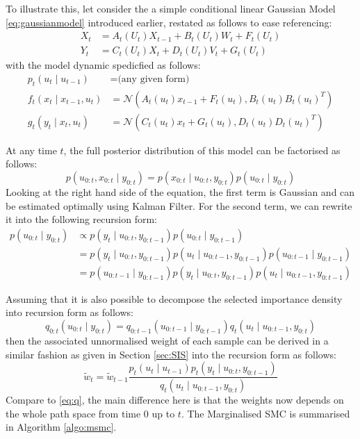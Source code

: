 To illustrate this, let consider the a simple conditional linear Gaussian Model \eqref{eq:gaussianmodel} introduced earlier, restated as follows to ease referencing:
\begin{align*}
  X_t &= A_t(U_t)X_{t-1} + B_t(U_t)W_t + F_t(U_t) \\
  Y_t &= C_t(U_t)X_t + D_t(U_t)V_t + G_t(U_t)
\end{align*}
with the model dynamic spedicfied as follows:
\begin{align}
  p_t(u_t \mid u_{t-1}) &= \textrm{(any given form)} \nonumber \\
  f_t(x_t \mid x_{t-1}, u_t) &= \mathcal{N}(A_t(u_t) x_{t-1} + F_t(u_t), B_t(u_t)B_t(u_t)^T) \nonumber \\
  g_t(y_t \mid x_t, u_t)    &= \mathcal{N}(C_t(u_t) x_t + G_t(u_t), D_t(u_t)D_t(u_t)^T)
\end{align}

At any time $t$, the full posterior distribution of this model can be factorised as follows:
\begin{equation}
  p(u_{0:t}, x_{0:t} \mid y_{0:t}) = p(x_{0:t} \mid u_{0:t}, y_{0:t}) p(u_{0:t} \mid y_{0:t})
\end{equation}
Looking at the right hand side of the equation, the first term is Gaussian and can be estimated optimally using Kalman Filter. For the second term, we can rewrite it into the following recursion form:
\begin{align}
p(u_{0:t} \mid y_{0:t}) &\propto p(y_t \mid u_{0:t}, y_{0:t-1}) p(u_{0:t} \mid y_{0:t-1}) \nonumber \\
&=  p(y_t \mid u_{0:t}, y_{0:t-1}) p(u_t \mid u_{0:t-1}, y_{0:t-1}) p(u_{0:t-1} \mid y_{0:t-1}) \nonumber \\
&=  p(u_{0:t-1} \mid y_{0:t-1}) p(y_t \mid u_{0:t}, y_{0:t-1}) p(u_t \mid u_{0:t-1}, y_{0:t-1}) 
\label{eq:msmc}
\end{align}

Assuming that it is also possible to decompose the selected importance density into recursion form as follows:
\begin{equation}
	q_{0:t}(u_{0:t} \mid y_{0:t}) = q_{0:t-1}(u_{0:t-1} \mid y_{0:t-1}) q_t(u_t \mid u_{0:t-1}, y_{0:t}) 
\label{eq:q2}
\end{equation}
then the associated unnormalised weight of each sample can be derived in a similar fashion as given in Section \ref{sec:SIS} into the recursion form as follows:
\begin{equation}
   \tilde{w}_t  = \tilde{w}_{t-1} \dfrac{p_t(u_t \mid u_{t-1})p_t(y_t \mid u_{0:t}, y_{0:t-1})}{q_t(u_t \mid u_{0:t-1}, y_{0:t})}
   \label{eq:wsmsc}
\end{equation}
Compare to \eqref{eq:q}, the main difference here is that the weights now depends on the whole path space from time $0$ up to $t$. The Marginalised SMC is summarised in Algorithm \ref{algo:msmc}.

